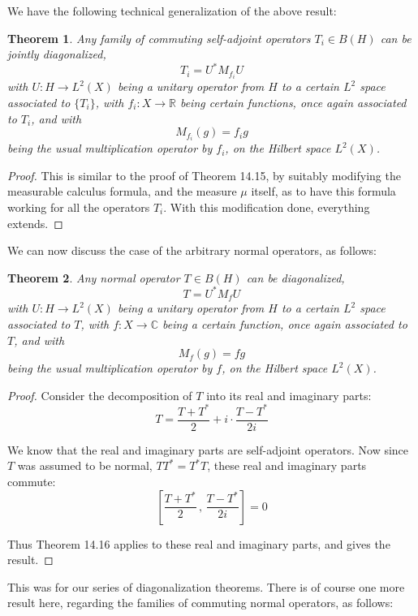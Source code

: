 \documentclass[12pt]{amsbook}
\newtheorem{theorem}{Theorem}[chapter]
\begin{document}
We have the following technical generalization of the above result:

\begin{theorem}
Any family of commuting self-adjoint operators $T_i\in B(H)$ can be jointly diagonalized,
$$T_i=U^*M_{f_i}U$$
with $U:H\to L^2(X)$ being a unitary operator from $H$ to a certain $L^2$ space associated to $\{T_i\}$, with $f_i:X\to\mathbb R$ being certain functions, once again associated to $T_i$, and with
$$M_{f_i}(g)=f_ig$$
being the usual multiplication operator by $f_i$, on the Hilbert space $L^2(X)$.
\end{theorem}

\begin{proof}
This is similar to the proof of Theorem 14.15, by suitably modifying the measurable calculus formula, and the measure $\mu$ itself, as to have this formula working for all the operators $T_i$. With this modification done, everything extends.
\end{proof}

We can now discuss the case of the arbitrary normal operators, as follows:

\begin{theorem}
Any normal operator $T\in B(H)$ can be diagonalized,
$$T=U^*M_fU$$
with $U:H\to L^2(X)$ being a unitary operator from $H$ to a certain $L^2$ space associated to $T$, with $f:X\to\mathbb C$ being a certain function, once again associated to $T$, and with
$$M_f(g)=fg$$
being the usual multiplication operator by $f$, on the Hilbert space $L^2(X)$.
\end{theorem}

\begin{proof}
Consider the decomposition of $T$ into its real and imaginary parts:
$$T=\frac{T+T^*}{2}+i\cdot\frac{T-T^*}{2i}$$

We know that the real and imaginary parts are self-adjoint operators. Now since $T$ was assumed to be normal, $TT^*=T^*T$, these real and imaginary parts commute:
$$\left[\frac{T+T^*}{2}\,,\,\frac{T-T^*}{2i}\right]=0$$

Thus Theorem 14.16 applies to these real and imaginary parts, and gives the result.
\end{proof}

This was for our series of diagonalization theorems. There is of course one more result here, regarding the families of commuting normal operators, as follows:

\end{document}
